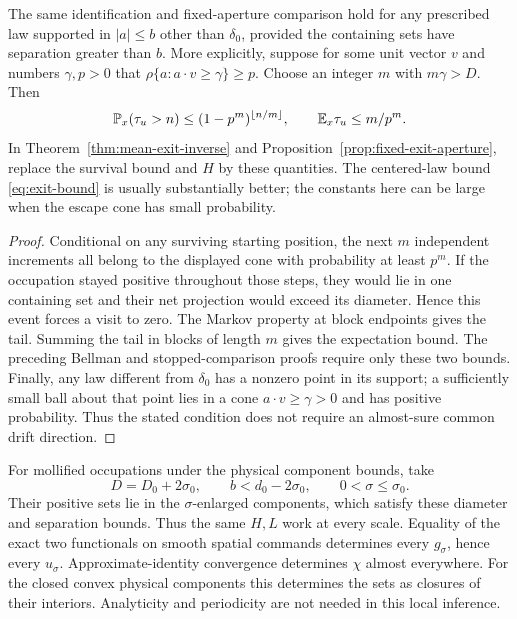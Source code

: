 \begin{corollary}
\label{cor:noncentered-exit}
The same identification and fixed-aperture comparison hold for any
prescribed law supported in $|a|\le b$ other than $\delta_0$, provided
the containing sets have separation greater than $b$. More explicitly,
suppose for some unit vector $v$ and numbers $\gamma,p>0$ that
$\rho\{a:a\cdot v\ge\gamma\}\ge p$. Choose an integer $m$ with
$m\gamma>D$. Then
\[
 \mathbb P_x(\tau_u>n)\le(1-p^m)^{\lfloor n/m\rfloor},\qquad
 \mathbb E_x\tau_u\le m/p^m.
\]
In Theorem~\ref{thm:mean-exit-inverse} and
Proposition~\ref{prop:fixed-exit-aperture}, replace the survival bound
and $H$ by these quantities. The centered-law bound
\eqref{eq:exit-bound} is usually substantially better; the constants
here can be large when the escape cone has small probability.
\end{corollary}
\begin{proof}
Conditional on any surviving starting position, the next $m$
independent increments all belong to the displayed cone with probability
at least $p^m$. If the occupation stayed positive throughout those
steps, they would lie in one containing set and their net projection
would exceed its diameter. Hence this event forces a visit to zero.
The Markov property at block endpoints gives the tail. Summing the tail
in blocks of length $m$ gives the expectation bound. The preceding
Bellman and stopped-comparison proofs require only these two bounds.
Finally, any law different from $\delta_0$ has a nonzero point in its
support; a sufficiently small ball about that point lies in a cone
$a\cdot v\ge\gamma>0$ and has positive probability. Thus the stated
condition does not require an almost-sure common drift direction.
\end{proof}

For mollified occupations under the physical component bounds, take
\begin{equation}\label{eq:uniform-exit-prior}
 D=D_0+2\sigma_0,\qquad b<d_0-2\sigma_0,
 \qquad 0<\sigma\le\sigma_0.
\end{equation}
Their positive sets lie in the $\sigma$-enlarged components, which
satisfy these diameter and separation bounds. Thus the same $H,L$
work at every scale. Equality of the exact two functionals on smooth
spatial commands determines every $g_\sigma$, hence every $u_\sigma$.
Approximate-identity convergence determines $\chi$ almost everywhere.
For the closed convex physical components this determines the sets
as closures of their interiors. Analyticity and periodicity are not
needed in this local inference.

